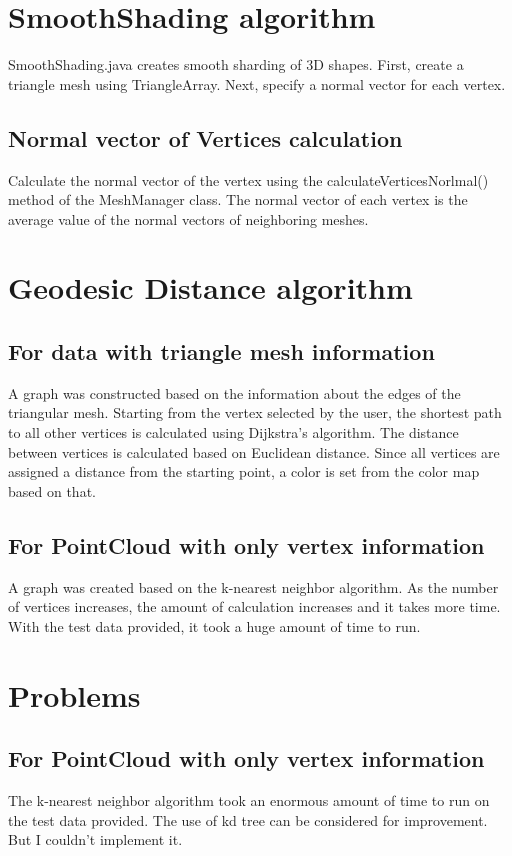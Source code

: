 \documentclass[12pt]{article}
\begin{document}
\section{SmoothShading algorithm}
SmoothShading.java creates smooth sharding of 3D shapes. First, create a
triangle mesh using TriangleArray. Next, specify a normal vector for each
vertex.
\subsection{Normal vector of Vertices calculation}
Calculate the normal vector of the vertex using the calculateVerticesNorlmal()
method of the MeshManager class. The normal vector of each vertex is the
average value of the normal vectors of
neighboring meshes.

\section{Geodesic Distance algorithm}

\subsection{For data with triangle mesh information}
A graph was constructed based on the information about the edges of the
triangular mesh. Starting from the vertex selected by the user, the shortest
path to all other vertices is calculated using Dijkstra's algorithm. The
distance between vertices is calculated based on Euclidean distance. Since all
vertices are assigned a distance from the starting point, a color is set from
the color map based on that.
\subsection{For PointCloud with only vertex information}
A graph was created based on the k-nearest neighbor algorithm. As the number of
vertices increases, the amount of calculation increases and it takes more time.
With the test data provided, it took a huge amount of time to run.

\section{Problems}
\subsection{For PointCloud with only vertex information}
The k-nearest neighbor algorithm took an enormous amount of time to run on the
test data provided.
The use of kd tree can be considered for improvement. But I couldn't implement
it.
\end{document}
